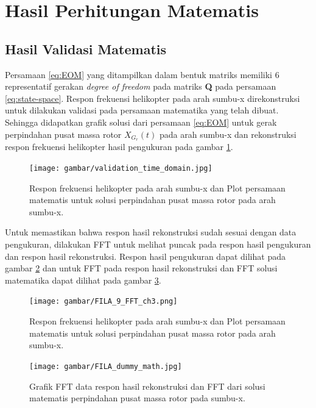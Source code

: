 \section{Hasil Perhitungan Matematis}

\subsection{Hasil Validasi Matematis}

Persamaan \ref{eq:EOM} yang ditampilkan dalam bentuk matriks memiliki 6 representatif gerakan \textit{degree of freedom} pada matriks \textbf{Q} pada persamaan \ref{eq:state-space}. Respon frekuensi helikopter pada arah sumbu-x direkonstruksi untuk dilakukan validasi pada persamaan matematika yang telah dibuat. Sehingga didapatkan grafik solusi dari persamaan \ref{eq:EOM} untuk gerak perpindahan pusat massa rotor $X_{G_r}(t)$ pada arah sumbu-x dan rekonstruksi respon frekuensi helikopter hasil pengukuran pada gambar \ref{fig:validation_time_domain}. 

\begin{figure}[H]
	\centering
	\texttt{[image: gambar/validation\_time\_domain.jpg]}
	\caption{Respon frekuensi helikopter pada arah sumbu-x dan Plot persamaan matematis untuk solusi perpindahan pusat massa rotor pada arah sumbu-x.}
	\label{fig:validation_time_domain}
\end{figure}

Untuk memastikan bahwa respon hasil rekonstruksi sudah sesuai dengan data pengukuran, dilakukan FFT untuk melihat puncak pada respon hasil pengukuran dan respon hasil rekonstruksi. Respon hasil pengukuran dapat dilihat pada gambar \ref{fig:FFT_ch3} dan untuk FFT pada respon hasil rekonstruksi dan FFT solusi matematika dapat dilihat pada gambar \ref{fig:FFT_validation}.

\begin{figure}[H]
	\centering
	\texttt{[image: gambar/FILA\_9\_FFT\_ch3.png]}
	\caption{Respon frekuensi helikopter pada arah sumbu-x dan Plot persamaan matematis untuk solusi perpindahan pusat massa rotor pada arah sumbu-x.}
	\label{fig:FFT_ch3}
\end{figure}

\begin{figure}[H]
	\centering
	\texttt{[image: gambar/FILA\_dummy\_math.jpg]}
	\caption{Grafik FFT data respon hasil rekonstruksi dan FFT dari solusi matematis perpindahan pusat massa rotor pada sumbu-x.}
	\label{fig:FFT_validation}
\end{figure}

